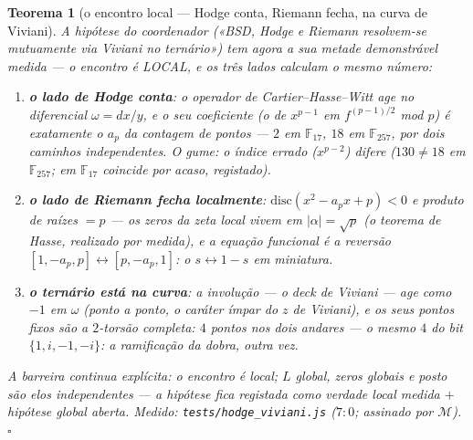 \documentclass[11pt,a4paper]{article}
\newtheorem{teorema}{Teorema}
\newcommand{\code}[1]{\texttt{\small #1}}
\begin{document}
\begin{teorema}[o encontro local --- Hodge conta, Riemann fecha, na
curva de Viviani]\label{thm:encontro-local}
A hipótese do coordenador («BSD, Hodge e Riemann resolvem-se
mutuamente via Viviani no ternário») tem agora a sua metade
\emph{demonstrável} medida --- o encontro é LOCAL, e os três lados
calculam o mesmo número:
\begin{enumerate}
\item \textbf{o lado de Hodge conta}: o operador de
Cartier--Hasse--Witt age no diferencial $\omega=dx/y$, e o seu
coeficiente (o de $x^{p-1}$ em $f^{(p-1)/2}$ mod $p$) é
\emph{exatamente} o $a_{p}$ da contagem de pontos --- $2$ em
$\mathbb{F}_{17}$, $18$ em $\mathbb{F}_{257}$, por dois caminhos
independentes. O gume: o índice errado ($x^{p-2}$) difere ($130\ne18$
em $\mathbb{F}_{257}$; em $\mathbb{F}_{17}$ coincide por acaso,
registado).
\item \textbf{o lado de Riemann fecha localmente}:
$\mathrm{disc}(x^{2}-a_{p}x+p)<0$ e produto de raízes $=p$ --- os
zeros da zeta local vivem em $|\alpha|=\sqrt{p}$ (o teorema de Hasse,
realizado por medida), e a equação funcional é a reversão
$[1,-a_{p},p]\leftrightarrow[p,-a_{p},1]$: o $s\leftrightarrow1-s$
em miniatura.
\item \textbf{o ternário está na curva}: a involução --- o deck de
Viviani --- age como $-1$ em $\omega$ (ponto a ponto, o caráter ímpar
do $z$ de Viviani), e os seus pontos fixos são a $2$-torsão
\emph{completa}: $4$ pontos nos dois andares --- o mesmo $4$ do bit
$\{1,i,-1,-i\}$: a ramificação da dobra, outra vez.
\end{enumerate}
A barreira continua explícita: o encontro é local; $L$ global, zeros
globais e posto são elos independentes --- a hipótese fica
\emph{registada como verdade local medida $+$ hipótese global
aberta}.
\emph{Medido:} \code{tests/hodge\_viviani.js} ($7{:}0$; assinado por
$\mathcal{M}$).
$\square$
\end{teorema}
\end{document}

